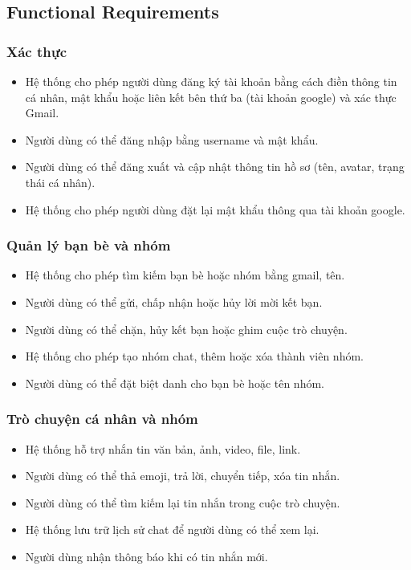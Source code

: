 \documentclass[a4paper, 12pt]{article}
\begin{document}
	
	
	
	\subsection{Functional Requirements}
	
	\subsubsection{Xác thực}
	\begin{itemize}
		\item Hệ thống cho phép người dùng đăng ký tài khoản bằng cách điền thông tin cá nhân, mật khẩu hoặc liên kết bên thứ ba (tài khoản google) và xác thực Gmail.
		\item Người dùng có thể đăng nhập bằng username và mật khẩu.
		\item Người dùng có thể đăng xuất và cập nhật thông tin hồ sơ (tên, avatar, trạng thái cá nhân).
		\item Hệ thống cho phép người dùng đặt lại mật khẩu thông qua tài khoản google.
	\end{itemize}
	
	\subsubsection{Quản lý bạn bè và nhóm}
	\begin{itemize}
		\item Hệ thống cho phép tìm kiếm bạn bè hoặc nhóm bằng gmail, tên.
		\item Người dùng có thể gửi, chấp nhận hoặc hủy lời mời kết bạn.
		\item Người dùng có thể chặn, hủy kết bạn hoặc ghim cuộc trò chuyện.
		\item Hệ thống cho phép tạo nhóm chat, thêm hoặc xóa thành viên nhóm.
		\item Người dùng có thể đặt biệt danh cho bạn bè hoặc tên nhóm.
	\end{itemize}
	
	\subsubsection{Trò chuyện cá nhân và nhóm}
	\begin{itemize}
		\item Hệ thống hỗ trợ nhắn tin văn bản, ảnh, video, file, link.
		\item Người dùng có thể thả emoji, trả lời, chuyển tiếp, xóa tin nhắn.
		\item Người dùng có thể tìm kiếm lại tin nhắn trong cuộc trò chuyện.
		\item Hệ thống lưu trữ lịch sử chat để người dùng có thể xem lại.
		\item Người dùng nhận thông báo khi có tin nhắn mới.
	\end{itemize}
	
\end{document}
